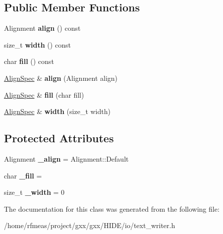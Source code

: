 \subsection*{Public Member Functions}
\begin{DoxyCompactItemize}
\item 
Alignment {\bfseries align} () const \hypertarget{classgxx_1_1AlignSpec_a654c771a049d0e13db0b7f76ab4d1b3e}{}\label{classgxx_1_1AlignSpec_a654c771a049d0e13db0b7f76ab4d1b3e}

\item 
size\+\_\+t {\bfseries width} () const \hypertarget{classgxx_1_1AlignSpec_a04e46885c43f5723db9f5ea60167e2ed}{}\label{classgxx_1_1AlignSpec_a04e46885c43f5723db9f5ea60167e2ed}

\item 
char {\bfseries fill} () const \hypertarget{classgxx_1_1AlignSpec_a99f16ecd665cca2e55c81cf35e1ea25d}{}\label{classgxx_1_1AlignSpec_a99f16ecd665cca2e55c81cf35e1ea25d}

\item 
\hyperlink{classgxx_1_1AlignSpec}{Align\+Spec} \& {\bfseries align} (Alignment align)\hypertarget{classgxx_1_1AlignSpec_a1120c1314faf5dd458313fe5961b7c92}{}\label{classgxx_1_1AlignSpec_a1120c1314faf5dd458313fe5961b7c92}

\item 
\hyperlink{classgxx_1_1AlignSpec}{Align\+Spec} \& {\bfseries fill} (char fill)\hypertarget{classgxx_1_1AlignSpec_ad06cfdf3df3fb1a0cbcdfccd028f0b3d}{}\label{classgxx_1_1AlignSpec_ad06cfdf3df3fb1a0cbcdfccd028f0b3d}

\item 
\hyperlink{classgxx_1_1AlignSpec}{Align\+Spec} \& {\bfseries width} (size\+\_\+t width)\hypertarget{classgxx_1_1AlignSpec_a2092d47a38e4c52e5964a732e1ddfb52}{}\label{classgxx_1_1AlignSpec_a2092d47a38e4c52e5964a732e1ddfb52}

\end{DoxyCompactItemize}
\subsection*{Protected Attributes}
\begin{DoxyCompactItemize}
\item 
Alignment {\bfseries \+\_\+align} = Alignment\+::\+Default\hypertarget{classgxx_1_1AlignSpec_a0d77546b010f8017183deaf6d6ce5461}{}\label{classgxx_1_1AlignSpec_a0d77546b010f8017183deaf6d6ce5461}

\item 
char {\bfseries \+\_\+fill} = \textquotesingle{} \textquotesingle{}\hypertarget{classgxx_1_1AlignSpec_acf8cdffda2b9f09d89d064502ba5fb84}{}\label{classgxx_1_1AlignSpec_acf8cdffda2b9f09d89d064502ba5fb84}

\item 
size\+\_\+t {\bfseries \+\_\+width} = 0\hypertarget{classgxx_1_1AlignSpec_a139fcb8175b7bd492d6adcf64adccc1b}{}\label{classgxx_1_1AlignSpec_a139fcb8175b7bd492d6adcf64adccc1b}

\end{DoxyCompactItemize}


The documentation for this class was generated from the following file\+:\begin{DoxyCompactItemize}
\item 
/home/rfmeas/project/gxx/gxx/\+H\+I\+D\+E/io/text\+\_\+writer.\+h\end{DoxyCompactItemize}
